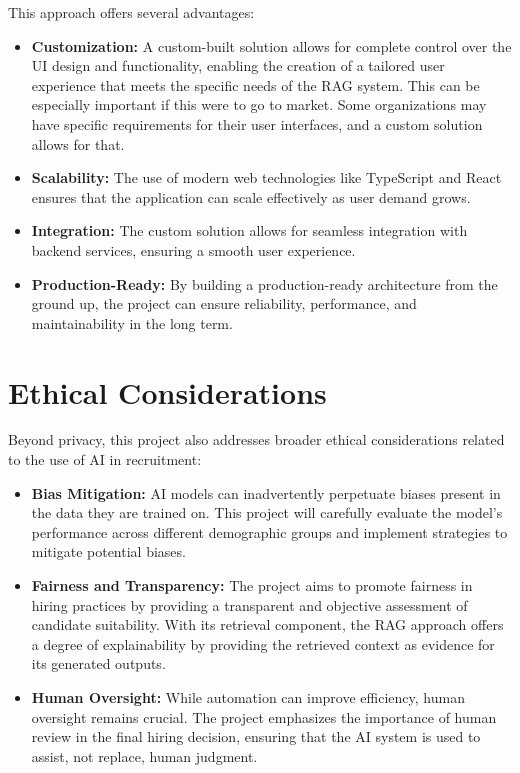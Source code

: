 \documentclass[12pt]{report}
\begin{document}
This approach offers several advantages:
\begin{itemize}
    \item \textbf{Customization:} A custom-built solution allows for complete control over the UI design and functionality, enabling the creation of a tailored user experience that meets the specific needs of the RAG system. This can be especially important if this were to go to market. Some organizations may have specific requirements for their user interfaces, and a custom solution allows for that.
    \item \textbf{Scalability:} The use of modern web technologies like TypeScript and React ensures that the application can scale effectively as user demand grows.
    \item \textbf{Integration:} The custom solution allows for seamless integration with backend services, ensuring a smooth user experience.
    \item \textbf{Production-Ready:} By building a production-ready architecture from the ground up, the project can ensure reliability, performance, and maintainability in the long term.
\end{itemize}

\section{Ethical Considerations}
Beyond privacy, this project also addresses broader ethical considerations related to the use of AI in recruitment:
\begin{itemize}
    \item \textbf{Bias Mitigation:} AI models can inadvertently perpetuate biases present in the data they are trained on. This project will carefully evaluate the model's performance across different demographic groups and implement strategies to mitigate potential biases.
    \item \textbf{Fairness and Transparency:} The project aims to promote fairness in hiring practices by providing a transparent and objective assessment of candidate suitability. With its retrieval component, the RAG approach offers a degree of explainability by providing the retrieved context as evidence for its generated outputs.
    \item \textbf{Human Oversight:} While automation can improve efficiency, human oversight remains crucial. The project emphasizes the importance of human review in the final hiring decision, ensuring that the AI system is used to assist, not replace, human judgment. 
\end{itemize}
\end{document}
